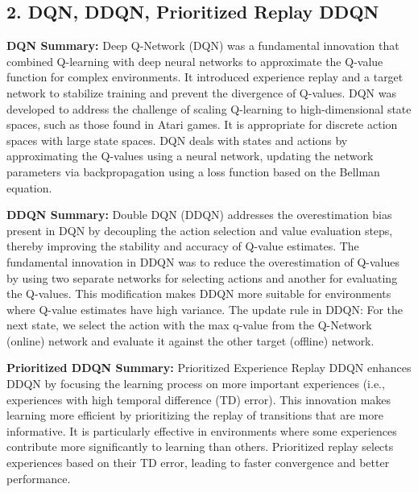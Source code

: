\documentclass[a4paper,10pt]{article}
\begin{document}
\begin{multicols}{2}
\section*{2. DQN, DDQN, Prioritized Replay DDQN}
\textbf{DQN Summary:} Deep Q-Network (DQN) was a fundamental innovation that combined Q-learning with deep neural networks to approximate the Q-value function for complex environments. It introduced experience replay and a target network to stabilize training and prevent the divergence of Q-values. DQN was developed to address the challenge of scaling Q-learning to high-dimensional state spaces, such as those found in Atari games. It is appropriate for discrete action spaces with large state spaces. DQN deals with states and actions by approximating the Q-values using a neural network, updating the network parameters via backpropagation using a loss function based on the Bellman equation.

\noindent \textbf{DDQN Summary:} Double DQN (DDQN) addresses the overestimation bias present in DQN by decoupling the action selection and value evaluation steps, thereby improving the stability and accuracy of Q-value estimates. The fundamental innovation in DDQN was to reduce the overestimation of Q-values by using two separate networks for selecting actions and another for evaluating the Q-values. This modification makes DDQN more suitable for environments where Q-value estimates have high variance. The update rule in DDQN: For the next state, we select the action with the max q-value from the Q-Network (online) network and evaluate it against the other target (offline) network.

\noindent \textbf{Prioritized DDQN Summary:} Prioritized Experience Replay DDQN enhances DDQN by focusing the learning process on more important experiences (i.e., experiences with high temporal difference (TD) error). This innovation makes learning more efficient by prioritizing the replay of transitions that are more informative. It is particularly effective in environments where some experiences contribute more significantly to learning than others. Prioritized replay selects experiences based on their TD error, leading to faster convergence and better performance.


\end{multicols}
\end{document}
